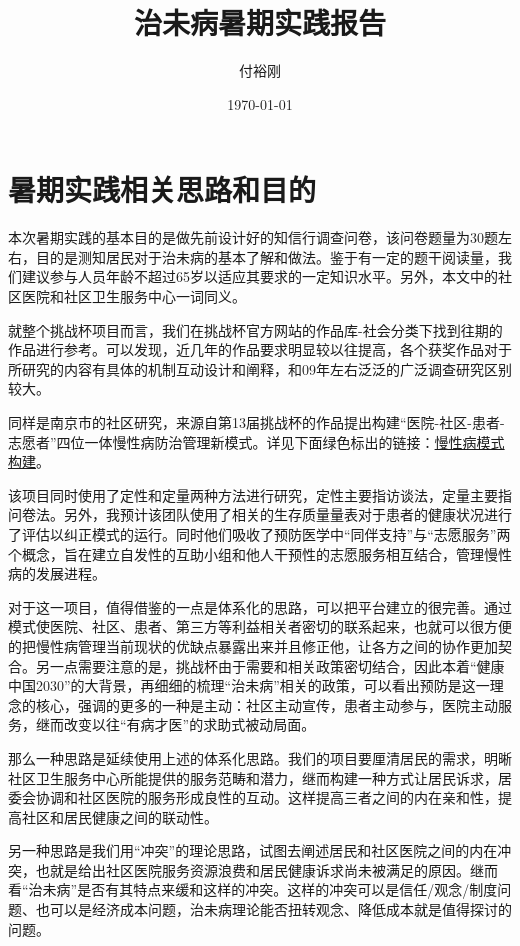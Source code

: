 \documentclass{article}
\author{付裕刚}
\title{治未病暑期实践报告}
\date{\today}
\begin{document}
    \maketitle
    \clearpage
    \section{暑期实践相关思路和目的}
    本次暑期实践的基本目的是做先前设计好的知信行调查问卷，该问卷题量为30题左右，目的是测知居民对于治未病的基本了解和做法。鉴于有一定的题干阅读量，我们建议参与人员年龄不超过65岁以适应其要求的一定知识水平。另外，本文中的社区医院和社区卫生服务中心一词同义。
    
    就整个挑战杯项目而言，我们在挑战杯官方网站的作品库-社会分类下找到往期的作品进行参考。可以发现，近几年的作品要求明显较以往提高，各个获奖作品对于所研究的内容有具体的机制互动设计和阐释，和09年左右泛泛的广泛调查研究区别较大。
    
    同样是南京市的社区研究，来源自第13届挑战杯的作品提出构建“医院-社区-患者-志愿者”四位一体慢性病防治管理新模式。详见下面绿色标出的链接：\href{http://2017.tiaozhanbei.net/d37/project/124/}{慢性病模式构建}。
    
    该项目同时使用了定性和定量两种方法进行研究，定性主要指访谈法，定量主要指问卷法。另外，我预计该团队使用了相关的生存质量量表对于患者的健康状况进行了评估以纠正模式的运行。同时他们吸收了预防医学中“同伴支持”与“志愿服务”两个概念，旨在建立自发性的互助小组和他人干预性的志愿服务相互结合，管理慢性病的发展进程。
    
    对于这一项目，值得借鉴的一点是体系化的思路，可以把平台建立的很完善。通过模式使医院、社区、患者、第三方等利益相关者密切的联系起来，也就可以很方便的把慢性病管理当前现状的优缺点暴露出来并且修正他，让各方之间的协作更加契合。另一点需要注意的是，挑战杯由于需要和相关政策密切结合，因此本着“健康中国2030”的大背景，再细细的梳理“治未病”相关的政策，可以看出预防是这一理念的核心，强调的更多的一种是主动：社区主动宣传，患者主动参与，医院主动服务，继而改变以往“有病才医”的求助式被动局面。
    
    那么一种思路是延续使用上述的体系化思路。我们的项目要厘清居民的需求，明晰社区卫生服务中心所能提供的服务范畴和潜力，继而构建一种方式让居民诉求，居委会协调和社区医院的服务形成良性的互动。这样提高三者之间的内在亲和性，提高社区和居民健康之间的联动性。
    
    另一种思路是我们用“冲突”的理论思路，试图去阐述居民和社区医院之间的内在冲突，也就是给出社区医院服务资源浪费和居民健康诉求尚未被满足的原因。继而看“治未病”是否有其特点来缓和这样的冲突。这样的冲突可以是信任/观念/制度问题、也可以是经济成本问题，治未病理论能否扭转观念、降低成本就是值得探讨的问题。
    
\end{document}
